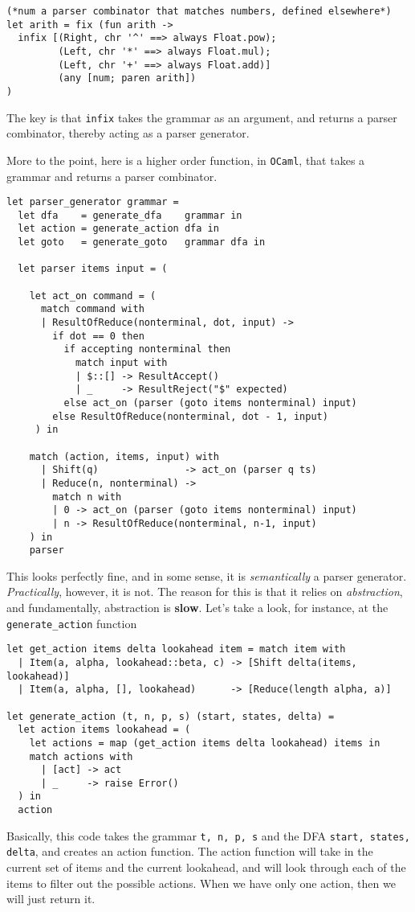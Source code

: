 \begin{verbatim}
(*num a parser combinator that matches numbers, defined elsewhere*)
let arith = fix (fun arith ->
  infix [(Right, chr '^' ==> always Float.pow);
         (Left, chr '*' ==> always Float.mul);
         (Left, chr '+' ==> always Float.add)]
         (any [num; paren arith])
)
\end{verbatim}

The key is that \texttt{infix} takes the grammar as an argument, and returns a parser combinator, thereby acting as a parser generator. 

More to the point, here is a higher order function, in \texttt{OCaml}, that takes a grammar and returns a parser combinator.

\begin{verbatim}
let parser_generator grammar =
  let dfa    = generate_dfa    grammar in
  let action = generate_action dfa in
  let goto   = generate_goto   grammar dfa in

  let parser items input = (

    let act_on command = (
      match command with
      | ResultOfReduce(nonterminal, dot, input) -> 
        if dot == 0 then
          if accepting nonterminal then 
            match input with
            | $::[] -> ResultAccept()
            | _     -> ResultReject("$" expected)
          else act_on (parser (goto items nonterminal) input)
        else ResultOfReduce(nonterminal, dot - 1, input)
     ) in 
    
    match (action, items, input) with
      | Shift(q)               -> act_on (parser q ts) 
      | Reduce(n, nonterminal) -> 
        match n with 
        | 0 -> act_on (parser (goto items nonterminal) input)
        | n -> ResultOfReduce(nonterminal, n-1, input)
    ) in 
    parser
\end{verbatim}
This looks perfectly fine, and in some sense, it is \textit{semantically} a parser generator. \textit{Practically}, however, it is not. The reason for this is that it relies on \textit{abstraction}, and fundamentally, abstraction is \textbf{slow}. Let's take a look, for instance, at the \texttt{generate\_action} function

\begin{verbatim}
let get_action items delta lookahead item = match item with
  | Item(a, alpha, lookahead::beta, c) -> [Shift delta(items, lookahead)]
  | Item(a, alpha, [], lookahead)      -> [Reduce(length alpha, a)]
  
let generate_action (t, n, p, s) (start, states, delta) =
  let action items lookahead = (
    let actions = map (get_action items delta lookahead) items in
    match actions with
      | [act] -> act
      | _     -> raise Error()
  ) in
  action
\end{verbatim}
Basically, this code takes the grammar \texttt{t, n, p, s} and the DFA \texttt{start, states, delta}, and creates an action function. The action function will take in the current set of items and the current lookahead, and will look through each of the items to filter out the possible actions. When we have only one action, then we will just return it. 

